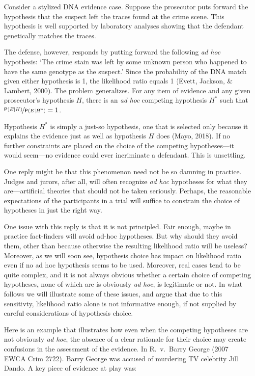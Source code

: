 \documentclass[
  10pt,
  dvipsnames,enabledeprecatedfontcommands]{scrartcl}
\newcommand{\pr}[1]{\mathsf{P}(#1)}
\begin{document}
Consider a stylized DNA evidence case. Suppose the prosecutor puts
forward the hypothesis that the suspect left the traces found at the
crime scene. This hypothesis is well supported by laboratory analyses
showing that the defendant genetically matches the traces.

The defense, however, responds by putting forward the following
\textit{ad hoc} hypothesis: `The crime stain was left by some unknown
person who happened to have the same genotype as the suspect.' Since the
probability of the DNA match given either hypothesis is 1, the
likelihood ratio equals 1 (Evett, Jackson, \& Lambert, 2000). The
problem generalizes. For any item of evidence and any given prosecutor's
hypothesis \(H\), there is an \textit{ad hoc} competing hypothesis
\(H^*\) such that \(\nicefrac{\pr{E \vert H}}{\pr{E \vert H^*}}=1\).

Hypothesis \(H^*\) is simply a just-so hypothesis, one that is selected
only because it explains the evidence just as well as hypothesis \(H\)
does (Mayo, 2018). If no further constraints are placed on the choice of
the competing hypotheses---it would seem---no evidence could ever
incriminate a defendant. This is unsettling.

One reply might be that this phenomenon need not be so damning in
practice. Judges and jurors, after all, will often recognize
\textit{ad hoc} hypotheses for what they are---artificial theories that
should not be taken seriously. Perhaps, the reasonable expectations of
the participants in a trial will suffice to constrain the choice of
hypotheses in just the right way.

One issue with this reply is that it is not principled. Fair enough,
maybe in practice fact-finders will avoid ad-hoc hypotheses. But why
should they avoid them, other than because otherwise the resulting
likelihood ratio will be useless? Moreover, as we will soon see,
hypothesis choice has impact on likelihood ratio even if no ad hoc
hypothesis seems to be used. Moreover, real cases tend to be quite
complex, and it is not always obvious whether a certain choice of
competing hypotheses, none of which are is obviously \textit{ad hoc}, is
legitimate or not. In what follows we will illustrate some of these
issues, and argue that due to this sensitivty, likelihood ratio alone is
not informative enough, if not supplied by careful considerations of
hypothesis choice.

Here is an example that illustrates how even when the competing
hypotheses are not obviously \textit{ad hoc}, the absence of a clear
rationale for their choice may create confusions in the assessment of
the evidence. In R.~v.~Barry George (2007 EWCA Crim 2722). Barry George
was accused of murdering TV celebrity Jill Dando. A key piece of
evidence at play was: \vspace{2mm}
\end{document}
